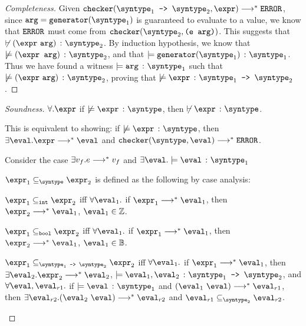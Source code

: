 \begin{proof}[Completeness]
   Given $\mkche{\mkfun{\syntype_1}{\syntype_2}}{\expr} \smallsteps[] \eerror$, since $\texttt{arg} = \mkgen{\syntype_1}$ is guaranteed to evaluate to a value, we know that $\eerror$ must come from $\mkche{\syntype_2}{\texttt{(e arg)}}$. This suggests that $\not\vdash \hastype{(\expr\ \texttt{arg})}{\syntype_2}$. By induction hypothesis, we know that $\not\models \hastype{(\texttt{\expr\ \texttt{arg}})}{\syntype_2}$, and that $\models \hastype{\mkgen{\syntype_1}}{\syntype_1}$. Thus we have found a witness $\models \hastype{\texttt{arg}}{\syntype_1}$ such that $\not\models \hastype{(\expr \ \texttt{arg})}{\syntype_2}$, proving that $\not\models \hastype{\expr}{\mkfun{\syntype_1}{\syntype_2}}$.

\end{proof}

\begin{proof}[Soundness]
  $\forall. \expr$ if $\not\models \hastype{\expr}{\syntype}$, then $\not\vdash \hastype{\expr}{\syntype}$.

  This is equivalent to showing: if $\not\models \hastype{\expr}{\syntype}$, then $\exists \eval. \expr \smallsteps[] \eval$ and $\mkche{\syntype}{\eval} \smallsteps[] \eerror$.

  Consider the case $\exists v_f. e \smallsteps[] v_f$ and $\exists \eval. \models \hastype{\eval}{\syntype_1}$

  \begin{definition}
    $\expr_1 \subseteq_{\syntype} \expr_2$ is defined as the following by case analysis:

    $\expr_1 \subseteq_{\tint} \expr_2$ iff $\forall \eval_1.$ if $\expr_1 \smallsteps[] \eval_1$, then $\expr_2 \smallsteps[] \eval_1$, $\eval_1 \in \mathbb{Z}$.

    $\expr_1 \subseteq_{\tbool} \expr_2$ iff $\forall \eval_1.$ if $\expr_1 \smallsteps[] \eval_1$, then $\expr_2 \smallsteps[] \eval_1$, $\eval_1 \in \mathbb{B}$.

    $\expr_1 \subseteq_{\mkfun{\syntype_1}{\syntype_2}} \expr_2$ iff $\forall \eval_1.$ if $\expr_1 \smallsteps[] \eval_1$, then $\exists \eval_2. \expr_2 \smallsteps[] \eval_2$, $\models \hastype{\eval_1, \eval_2}{\mkfun{\syntype_1}{\syntype_2}}$, and $\forall \eval, \eval_{r1}.$ if $\models \hastype{\eval}{\syntype_1}$ and $(\eval_1 \ \eval) \smallsteps[] \eval_{r1}$, then $\exists \eval_{r2}. (\eval_2 \ \eval) \smallsteps[] \eval_{r2}$ and $\eval_{r1} \subseteq_{\syntype_2} \eval_{r2}$.

  \end{definition}


\end{proof}
